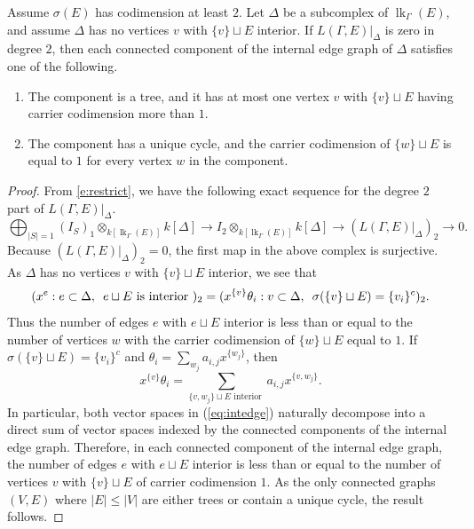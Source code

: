 \documentclass[ALCO, Unicode,published]{cedram}
\DeclareMathOperator{\lk}{lk}
\begin{document}
\begin{lemma}\label{lem:intedge}
Assume $\sigma(E)$ has codimension at least $2$. Let $\Delta$ be a subcomplex of $\lk_{\Gamma}(E)$, and assume $\Delta$ has no vertices $v$ with $\{v\} \sqcup E$ interior. If $L(\Gamma, E)|_{\Delta}$ is zero in degree $2$, then each connected component of the internal edge graph of $\Delta$ satisfies one of the following.
\begin{enumerate}
\item The component is a tree, and it has at most one  vertex $v$ with $\{v\} \sqcup E$ having carrier codimension more than $1$. 
\item The component has a unique cycle, and the carrier codimension of $\{w\} \sqcup E$ is equal to $1$ for every vertex $w$ in the component. 
\end{enumerate}
\end{lemma}

\begin{proof}
From \eqref{e:restrict}, we have the following exact sequence for the degree $2$ part of $L(\Gamma, E)|_{\Delta}$.
$$ \bigoplus_{\vert S \vert = 1} (I_S)_1\otimes_{k[\lk_{\Gamma}(E)]} k[\Delta]  \to I_2\otimes_{k[\lk_{\Gamma}(E)]} k[\Delta] \to (L(\Gamma, E)|_{\Delta})_2 \to 0.$$
Because $(L(\Gamma, E)|_{\Delta})_2 = 0$, the first map in the above complex is surjective.  As $\Delta$ has no vertices $v$ with $\{v\} \sqcup E$ interior, we see that
\begin{equation}\label{eq:intedge}
(x^{e}: e \subset \Delta, \enskip e \sqcup E \text{ is interior })_2 = (x^{\{v\}} \theta_{i}: v \subset \Delta, \enskip \sigma(\{v\} \sqcup E) = \{v_i\}^c)_2.
\end{equation}
Thus the number of edges $e$ with $e \sqcup E$ interior is less than or equal to the number of vertices $w$ with the carrier codimension of $\{w\} \sqcup E$ equal to $1$. If $\sigma(\{v\} \sqcup E) = \{v_i\}^c$ and $\theta_{i} = \sum_{w_j} a_{i,j}x^{\{w_j\}}$, then 
$$x^{\{v\}} \theta_{i} = \sum_{\{v, w_j\} \sqcup E \text{ interior }} a_{i,j}x^{\{v, w_j\}}.$$ In particular, both vector spaces in (\ref{eq:intedge}) naturally decompose into a direct sum of vector spaces indexed by the connected components of the internal edge graph. Therefore, in each connected component of the internal edge graph, the number of edges $e$ with $e \sqcup E$ interior is less than or equal to the number of vertices $v$ with $\{v\} \sqcup E$ of carrier codimension $1$. As the only connected graphs $(V, E)$ where $\vert E \vert \le \vert V \vert$ are either trees or contain a unique cycle, the result follows.
\end{proof}
\end{document}
